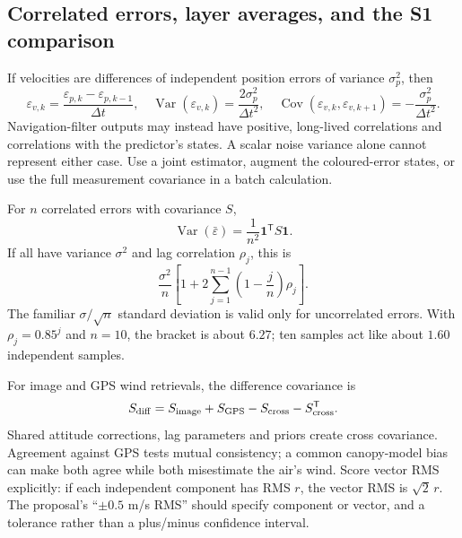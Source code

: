 \subsection{Correlated errors, layer averages, and the S1 comparison}
If velocities are differences of independent position errors of variance $\sigma_p^2$, then
\begin{equation}
 \varepsilon_{v,k}=\frac{\varepsilon_{p,k}-\varepsilon_{p,k-1}}{\Delta t},\quad
 \operatorname{Var}(\varepsilon_{v,k})=\frac{2\sigma_p^2}{\Delta t^2},\quad
 \operatorname{Cov}(\varepsilon_{v,k},\varepsilon_{v,k+1})=-\frac{\sigma_p^2}{\Delta t^2}.
\end{equation}
Navigation-filter outputs may instead have positive, long-lived correlations and correlations with the predictor's states. A scalar noise variance alone cannot represent either case. Use a joint estimator, augment the coloured-error states, or use the full measurement covariance in a batch calculation.

For $n$ correlated errors with covariance $S$,
\begin{equation}
 \operatorname{Var}(\bar\varepsilon)=\frac1{n^2}\mathbf1^{\mathsf T}S\mathbf1.
\end{equation}
If all have variance $\sigma^2$ and lag correlation $\rho_j$, this is
\begin{equation}
 \frac{\sigma^2}{n}\left[1+2\sum_{j=1}^{n-1}\left(1-\frac jn\right)\rho_j\right].
\end{equation}
The familiar $\sigma/\sqrt n$ standard deviation is valid only for uncorrelated errors. With $\rho_j=0.85^j$ and $n=10$, the bracket is about $6.27$; ten samples act like about $1.60$ independent samples.

For image and GPS wind retrievals, the difference covariance is
\begin{equation}
 S_{\rm diff}=S_{\rm image}+S_{\rm GPS}-S_{\rm cross}-S_{\rm cross}^{\mathsf T}.
\end{equation}
Shared attitude corrections, lag parameters and priors create cross covariance. Agreement against GPS tests mutual consistency; a common canopy-model bias can make both agree while both misestimate the air's wind. Score vector RMS explicitly: if each independent component has RMS $r$, the vector RMS is $\sqrt2\,r$. The proposal's ``$\pm0.5$ m/s RMS'' should specify component or vector, and a tolerance rather than a plus/minus confidence interval.

